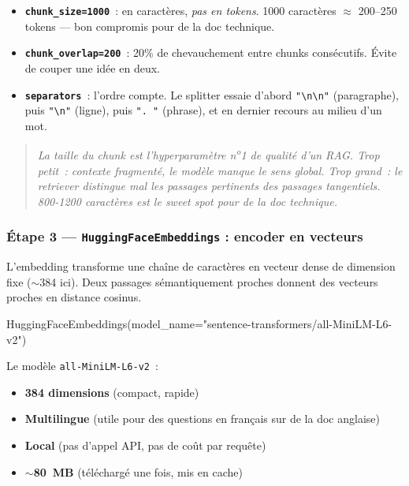 \documentclass[11pt,a4paper]{article}
\begin{document}
\begin{itemize}[leftmargin=*]
  \item \textbf{\texttt{chunk\_size=1000}}~: en caractères, \emph{pas en
        tokens}. 1000 caractères $\approx$ 200--250 tokens — bon compromis
        pour de la doc technique.
  \item \textbf{\texttt{chunk\_overlap=200}}~: 20\% de chevauchement entre
        chunks consécutifs. Évite de couper une idée en deux.
  \item \textbf{\texttt{separators}}~: l'ordre compte. Le splitter essaie
        d'abord \texttt{"\textbackslash n\textbackslash n"} (paragraphe),
        puis \texttt{"\textbackslash n"} (ligne), puis \texttt{". "} (phrase),
        et en dernier recours au milieu d'un mot.
\end{itemize}

\begin{quote}\itshape
La \emph{taille du chunk} est l'hyperparamètre n\textsuperscript{o}1 de
qualité d'un RAG. Trop petit~: contexte fragmenté, le modèle manque le
sens global. Trop grand~: le retriever distingue mal les passages
pertinents des passages tangentiels. 800-1200 caractères est le sweet
spot pour de la doc technique.
\end{quote}

\subsubsection*{Étape 3 — \texttt{HuggingFaceEmbeddings} : encoder en vecteurs}

L'embedding transforme une chaîne de caractères en vecteur dense de
dimension fixe ($\sim$384 ici). Deux passages sémantiquement proches
donnent des vecteurs proches en distance cosinus.

\begin{pythoncode}
HuggingFaceEmbeddings(model_name="sentence-transformers/all-MiniLM-L6-v2")
\end{pythoncode}

Le modèle \texttt{all-MiniLM-L6-v2}~:
\begin{itemize}[leftmargin=*]
  \item \textbf{384 dimensions} (compact, rapide)
  \item \textbf{Multilingue} (utile pour des questions en français sur
        de la doc anglaise)
  \item \textbf{Local} (pas d'appel API, pas de coût par requête)
  \item \textbf{$\sim$80~MB} (téléchargé une fois, mis en cache)
\end{itemize}
\end{document}
